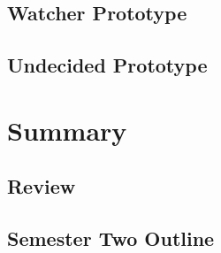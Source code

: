 \documentclass{article}
\begin{document}
\subsection{Watcher Prototype}

\subsection{Undecided Prototype}



\section{Summary}


\subsection{Review}



\subsection{Semester Two Outline}


\end{document}
